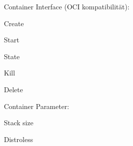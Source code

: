 \begin{notes}
    \item Container Interface (OCI kompatibilität):
    \begin{notes}
        \item Create
        \item Start
        \item State
        \item Kill
        \item Delete
    \end{notes}
    \item Container Parameter:
    \begin{notes}
        \item Stack size
        \item Distroless
        \item 
    \end{notes}
\end{notes}
